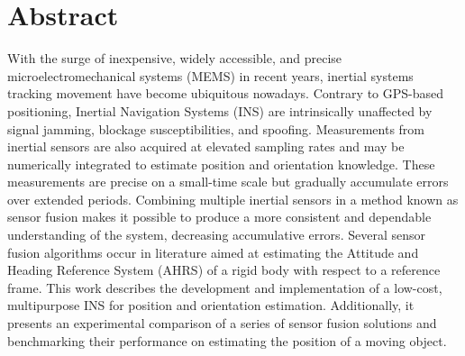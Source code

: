 \chapter*{Abstract}
\justify
With the surge of inexpensive, widely accessible, and precise microelectromechanical systems (MEMS) in recent years, inertial systems tracking movement have become ubiquitous nowadays. Contrary to GPS-based positioning, Inertial Navigation Systems (INS) are intrinsically unaffected by signal jamming, blockage susceptibilities, and spoofing. Measurements from inertial sensors are also acquired at elevated sampling rates and may be numerically integrated to estimate position and orientation knowledge. These measurements are precise on a small-time scale but gradually accumulate errors over extended periods. Combining multiple inertial sensors in a method known as sensor fusion makes it possible to produce a more consistent and dependable understanding of the system, decreasing accumulative errors. Several sensor fusion algorithms occur in literature aimed at estimating the Attitude and Heading Reference System (AHRS) of a rigid body with respect to a reference frame. This work describes the development and implementation of a low-cost, multipurpose INS for position and orientation estimation. Additionally, it presents an experimental comparison of a series of sensor fusion solutions and benchmarking their performance on estimating the position of a moving object.  \cite{}

